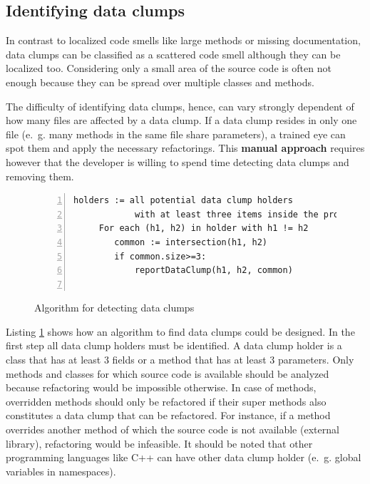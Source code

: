 \subsection{Identifying data clumps}\label{sec:data_clump_detection}
In contrast to localized code smells like large methods or missing documentation, data clumps can be classified as a scattered code smell although they can be localized too. Considering only a small area of the source code is often not enough because they can be spread over multiple classes and methods. 

The difficulty of identifying data clumps, hence, can vary strongly dependent of how many files are affected by a data clump. If a data clump resides in only one file (e.~g. many methods in the same file share parameters), a trained eye can spot them and apply the necessary refactorings. This \textbf{manual approach} requires however that the developer is willing to spend time detecting data clumps and removing them. 


\begin{figure}[ht!]
\begin{lstlisting}[numbers=left]
    holders := all potential data clump holders 
            with at least three items inside the project
     For each (h1, h2) in holder with h1 != h2
        common := intersection(h1, h2)
        if common.size>=3:
            reportDataClump(h1, h2, common)
        

\end{lstlisting}
\caption{Algorithm for detecting data clumps}
\label{lst:data_clumps_algo}
\end{figure}






Listing \ref{lst:data_clumps_algo} shows how an algorithm to find data clumps could be designed. In the first step all data clump holders must be identified.
A data clump holder is a class that has at least 3 fields or a method that has at least 3 parameters.  Only methods and classes for which source code is available should be analyzed because refactoring would be impossible otherwise. In case of methods, overridden methods should only be refactored if their super methods also constitutes a data clump that can be refactored.  For instance, if a method overrides another method of which the source code is not available (external library), refactoring would be infeasible. 
It should be noted that other programming languages like C++ can have other data clump holder (e.~g. global variables in namespaces). 


